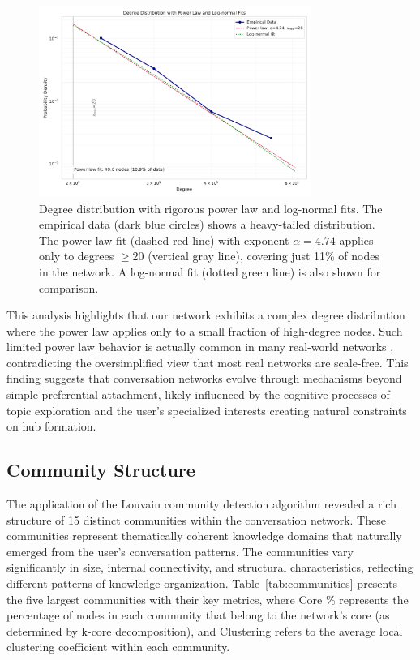 \documentclass[10pt, a4paper]{article}
\begin{document}
\begin{figure}
\centering
\includegraphics[width=3.5in]{./images/degree_distribution_fits.pdf}
\caption{Degree distribution with rigorous power law and log-normal fits. The empirical data (dark blue circles) shows a heavy-tailed distribution. The power law fit (dashed red line) with exponent $\alpha = 4.74$ applies only to degrees $\geq 20$ (vertical gray line), covering just 11\% of nodes in the network. A log-normal fit (dotted green line) is also shown for comparison.}
\label{fig:degree_dist}
\end{figure}

This analysis highlights that our network exhibits a complex degree distribution where the power law applies only to a small fraction of high-degree nodes. Such limited power law behavior is actually common in many real-world networks \cite{broido2019}, contradicting the oversimplified view that most real networks are scale-free. This finding suggests that conversation networks evolve through mechanisms beyond simple preferential attachment, likely influenced by the cognitive processes of topic exploration and the user's specialized interests creating natural constraints on hub formation.

\subsection{Community Structure}

The application of the Louvain community detection algorithm revealed a rich structure of 15 distinct communities within the conversation network. These communities represent thematically coherent knowledge domains that naturally emerged from the user's conversation patterns. The communities vary significantly in size, internal connectivity, and structural characteristics, reflecting different patterns of knowledge organization. Table~\ref{tab:communities} presents the five largest communities with their key metrics,
where Core \% represents the percentage of nodes in each community that belong to the network's core (as determined by k-core decomposition), and Clustering refers to the average local clustering coefficient within each community.
\end{document}
